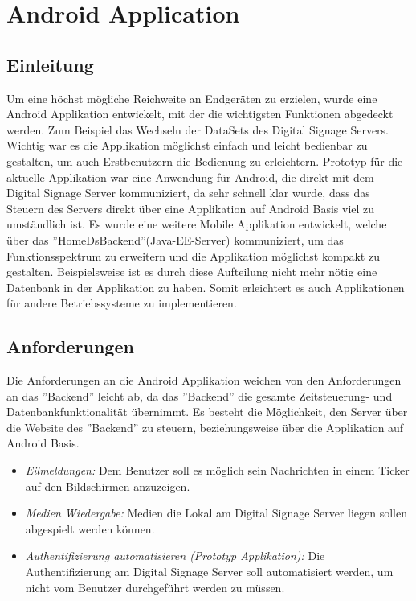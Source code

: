 \chapter{Android Application}
\section{Einleitung}
Um eine höchst mögliche Reichweite an Endgeräten zu erzielen, wurde eine Android Applikation entwickelt, mit der die wichtigsten Funktionen abgedeckt werden. Zum Beispiel das Wechseln der DataSets des Digital Signage Servers. Wichtig war es die Applikation möglichst einfach und leicht bedienbar zu gestalten, um auch Erstbenutzern die Bedienung zu erleichtern. 
Prototyp für die aktuelle Applikation war eine Anwendung für Android, die direkt mit dem Digital Signage Server kommuniziert, da sehr schnell klar wurde, dass das Steuern des Servers direkt über eine Applikation auf Android Basis viel zu umständlich ist. Es wurde eine weitere Mobile Applikation entwickelt, welche über das ''HomeDsBackend''(Java-EE-Server) kommuniziert, um das Funktionsspektrum zu erweitern und die Applikation möglichst kompakt zu gestalten. Beispielsweise ist es durch diese Aufteilung nicht mehr nötig eine Datenbank in der Applikation zu haben. Somit erleichtert es auch Applikationen für andere Betriebssysteme zu implementieren. 
\section{Anforderungen}
Die Anforderungen an die Android Applikation weichen von den Anforderungen an das ''Backend'' leicht ab, da das ''Backend'' die gesamte Zeitsteuerung- und Datenbankfunktionalität übernimmt. Es besteht die Möglichkeit, den Server über die Website des ''Backend'' zu steuern, beziehungsweise über die Applikation auf Android Basis. 
\begin{itemize}
	\item {\em Eilmeldungen:} Dem Benutzer soll es möglich sein Nachrichten in einem Ticker auf den Bildschirmen anzuzeigen.
	
	\item {\em Medien Wiedergabe:} Medien die Lokal am Digital Signage Server liegen sollen abgespielt werden können.
		
	\item {\em Authentifizierung automatisieren (Prototyp Applikation):} Die Authentifizierung am Digital Signage Server soll automatisiert werden, um nicht vom Benutzer durchgeführt werden zu müssen.  		
\end{itemize}
